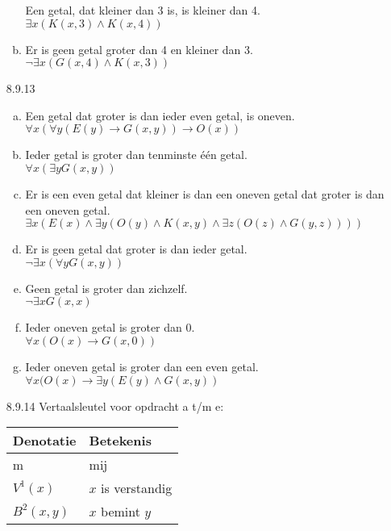 \begin{enumerate}
\begin{enumerate}[(a)]
        Een getal, dat kleiner dan 3 is, is kleiner dan 4.\\
        $\exists x (K(x,3) \land K(x,4))$
      \item Er is geen getal groter dan 4 en kleiner dan 3.\\
        $\neg \exists x (G(x,4) \land K(x,3))$
    \end{enumerate}
  \item[8.9.13]
    \begin{enumerate}[(a)]
      \item
        Een getal dat groter is dan ieder even getal, is oneven.\\
        $\forall x ( \forall y ( E(y) \rightarrow G(x,y) ) \rightarrow O(x))$
      \item
        Ieder getal is groter dan tenminste één getal.\\
        $\forall x ( \exists y G(x,y) )$
      \item
        Er is een even getal dat kleiner is dan een oneven getal dat groter is dan een oneven getal.\\
        $\exists x ( E(x) \land \exists y ( O(y) \land K(x,y) \land \exists z ( O(z) \land G(y,z) ) ) )$
      \item
        Er is geen getal dat groter is dan ieder getal.\\
        $\neg \exists x ( \forall y G(x,y) )$
      \item
        Geen getal is groter dan zichzelf.\\
        $\neg \exists x G(x,x)$
      \item
        Ieder oneven getal is groter dan 0.\\
        $\forall x ( O(x) \rightarrow G(x,0) )$
      \item
        Ieder oneven getal is groter dan een even getal.\\
        $\forall x ( O(x) \rightarrow \exists y ( E(y) \land G(x,y) )$
    \end{enumerate}
  \item[8.9.14]
    Vertaalsleutel voor opdracht a t/m e: \\
    \begin{tabular}{l|l}
      Denotatie  & Betekenis\\\hline
      m          & mij\\
      $V^1(x)$   & $x$ is verstandig\\
      $B^2(x,y)$ & $x$ bemint $y$
    \end{tabular}
    \begin{enumerate}[(a)]

\end{enumerate}
\end{enumerate}
